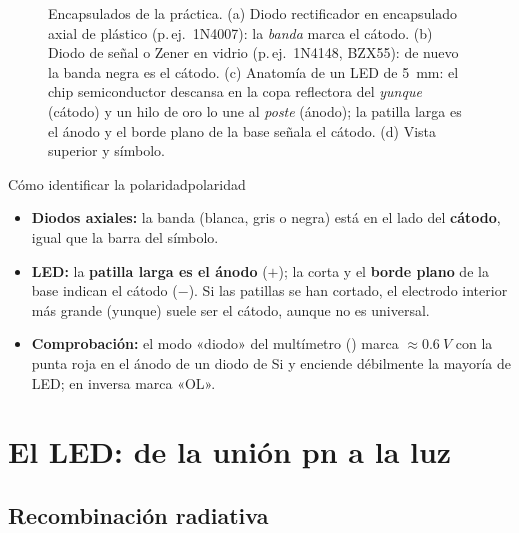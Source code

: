 \documentclass[11pt,a4paper]{article}
\begin{document}
\begin{figure}[htbp]
  \centering
  
  \caption{Encapsulados de la práctica. (a) Diodo rectificador en encapsulado
  axial de plástico (p.\,ej.\ 1N4007): la \emph{banda} marca el cátodo. (b)
  Diodo de señal o Zener en vidrio (p.\,ej.\ 1N4148, BZX55): de nuevo la
  banda negra es el cátodo. (c) Anatomía de un LED de \SI{5}{mm}: el chip
  semiconductor descansa en la copa reflectora del \emph{yunque} (cátodo) y un
  hilo de oro lo une al \emph{poste} (ánodo); la patilla larga es el ánodo y
  el borde plano de la base señala el cátodo. (d) Vista superior y símbolo.}
  \label{fig:encapsulados}
\end{figure}

\begin{laboratorio}{Cómo identificar la polaridad}{polaridad}
  \begin{itemize}[leftmargin=1.2em]
    \item \textbf{Diodos axiales:} la banda (blanca, gris o negra) está en el
      lado del \textbf{cátodo}, igual que la barra del símbolo.
    \item \textbf{LED:} la \textbf{patilla larga es el ánodo} ($+$); la corta
      y el \textbf{borde plano} de la base indican el cátodo ($-$). Si las
      patillas se han cortado, el electrodo interior más grande (yunque)
      suele ser el cátodo, aunque no es universal.
    \item \textbf{Comprobación:} el modo «diodo» del multímetro
      ()
      marca $\approx\SI{0.6}{V}$ con la punta roja en el ánodo de un diodo de
      Si y enciende débilmente la mayoría de LED; en inversa marca «OL».
  \end{itemize}
\end{laboratorio}

\section{El LED: de la unión pn a la luz}
\label{sec:led}

\subsection{Recombinación radiativa}
\end{document}
